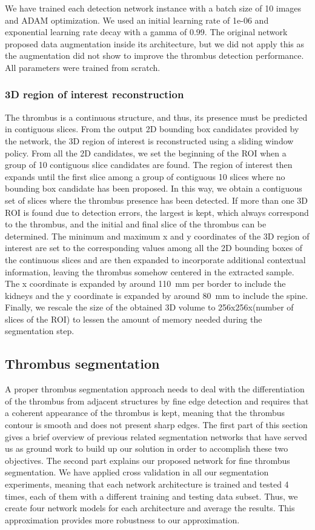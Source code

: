 \documentclass[preprint,authoryear,12pt]{elsarticle}
\begin{document}
We have trained each detection network instance with a batch size of 10 images and ADAM optimization. We used an initial learning rate of 1e-06 and exponential learning rate decay with a gamma of 0.99. The original network proposed data augmentation inside its architecture, but we did not apply this as the augmentation did not show to improve the thrombus detection performance. All parameters were trained from scratch.


\subsubsection{3D region of interest reconstruction}
The thrombus is a continuous structure, and thus, its presence must be predicted in contiguous slices. From the output 2D bounding box candidates provided by the network, the 3D region of interest is reconstructed using a sliding window policy. From all the 2D candidates, we set the beginning of the ROI when a group of 10 contiguous slice candidates are found. The region of interest then expands until the first slice among a group of contiguous 10 slices where no bounding box candidate has been proposed. In this way, we obtain a contiguous set of slices where the thrombus presence has been detected. If more than one 3D ROI is found due to detection errors, the largest is kept, which always correspond to the thrombus, and the initial and final slice of the thrombus can be determined. The minimum and maximum x and y coordinates of the 3D region of interest are set to the corresponding values among all the 2D bounding boxes of the continuous slices and are then expanded %
to incorporate additional contextual information, leaving the thrombus somehow centered in the extracted sample. The x coordinate is expanded by around 110~mm per border to include the kidneys and the y coordinate is expanded by around 80~mm to include the spine. Finally, we rescale the size of the obtained 3D volume to 256x256x(number of slices of the ROI) to lessen the amount of memory needed during the segmentation step.   


\subsection{Thrombus segmentation}
A proper thrombus segmentation approach needs to deal with the differentiation of the thrombus from adjacent structures by fine edge detection and requires that a coherent appearance of the thrombus is kept, meaning that the thrombus contour is smooth and does not present sharp edges. The first part of this section gives a brief overview of previous related segmentation networks that have served us as ground work to build up our solution in order to accomplish these two objectives.
The second part explains our proposed network for fine thrombus segmentation. We have applied cross validation in all our segmentation experiments, meaning that each network architecture is trained and tested 4 times, each of them with a different training and testing data subset. Thus, we create four network models for each architecture and average the results. This approximation provides more robustness to our approximation.
 
\end{document}
